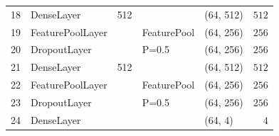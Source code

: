 \begin{frame}
\begin{table}[]
\begin{tabular}{@{}clcllr@{}}
18 & DenseLayer                & 512  &             & (64, 512)           & $512$     \\
19 & FeaturePoolLayer          &      & FeaturePool & (64, 256)           & $256$     \\
20 & DropoutLayer              &      & P=0.5       & (64, 256)           & $256$     \\
21 & DenseLayer                & 512  &             & (64, 512)           & $512$     \\
22 & FeaturePoolLayer          &      & FeaturePool & (64, 256)           & $256$     \\
23 & DropoutLayer              &      & P=0.5       & (64, 256)           & $256$     \\
24 & DenseLayer                &      &             & (64, 4)             & $4$       \\ \bottomrule
\end{tabular}
\end{table}

\end{frame}




